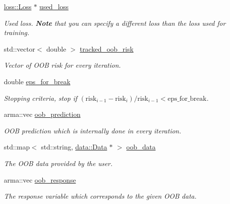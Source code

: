 \begin{DoxyCompactItemize}
\item 
\mbox{\hyperlink{classloss_1_1_loss}{loss\+::\+Loss}} $\ast$ \mbox{\hyperlink{classlogger_1_1_logger_oob_risk_af889f26216d86721dcab4fb0823ac525}{used\+\_\+loss}}
\begin{DoxyCompactList}\small\item\em Used loss. {\bfseries Note} that you can specify a different loss than the loss used for training. \end{DoxyCompactList}\item 
std\+::vector$<$ double $>$ \mbox{\hyperlink{classlogger_1_1_logger_oob_risk_abdc2e187dc393056b2986882dbb5b03f}{tracked\+\_\+oob\+\_\+risk}}
\begin{DoxyCompactList}\small\item\em Vector of O\+OB risk for every iteration. \end{DoxyCompactList}\item 
double \mbox{\hyperlink{classlogger_1_1_logger_oob_risk_ac4c642d6e83bfa16cc5c6026a1238f58}{eps\+\_\+for\+\_\+break}}
\begin{DoxyCompactList}\small\item\em Stopping criteria, stop if $(\mathrm{risk}_{i-1} - \mathrm{risk}_i) / \mathrm{risk}_{i-1} < \mathrm{eps\_for\_break}$. \end{DoxyCompactList}\item 
arma\+::vec \mbox{\hyperlink{classlogger_1_1_logger_oob_risk_a73c43ce74fa5cee78c00b1179bf84c58}{oob\+\_\+prediction}}
\begin{DoxyCompactList}\small\item\em O\+OB prediction which is internally done in every iteration. \end{DoxyCompactList}\item 
std\+::map$<$ std\+::string, \mbox{\hyperlink{classdata_1_1_data}{data\+::\+Data}} $\ast$ $>$ \mbox{\hyperlink{classlogger_1_1_logger_oob_risk_aad747d3aff49f9df9604cdd82bdb914b}{oob\+\_\+data}}
\begin{DoxyCompactList}\small\item\em The O\+OB data provided by the user. \end{DoxyCompactList}\item 
arma\+::vec \mbox{\hyperlink{classlogger_1_1_logger_oob_risk_a55a0c205b53d67467bf020547355c0a6}{oob\+\_\+response}}
\begin{DoxyCompactList}\small\item\em The response variable which corresponds to the given O\+OB data. \end{DoxyCompactList}\end{DoxyCompactItemize}
